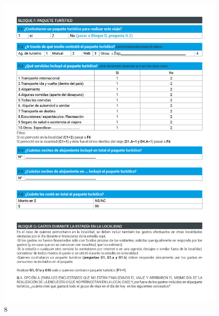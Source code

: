 \documentclass[
]{book}
\begin{document}
\begin{figure}
\includegraphics[width=17.22in]{imagenes/graf08} \caption{8}\label{fig:008}
\end{figure}
\end{document}
